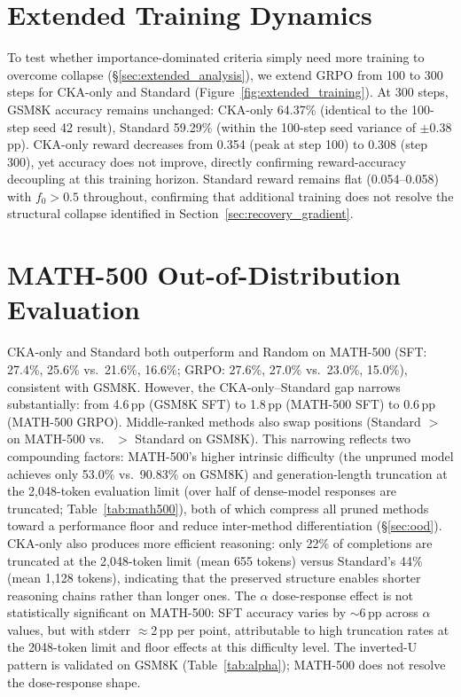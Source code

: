 \section{Extended Training Dynamics}
\label{sec:appendix_extended}

To test whether importance-dominated criteria simply need more training to overcome collapse (\S\ref{sec:extended_analysis}), we extend GRPO from 100 to 300 steps for CKA-only and Standard (Figure~\ref{fig:extended_training}).
At 300 steps, GSM8K accuracy remains unchanged: CKA-only 64.37\% (identical to the 100-step seed 42 result), Standard 59.29\% (within the 100-step seed variance of $\pm$0.38\,pp).
CKA-only reward decreases from 0.354 (peak at step 100) to 0.308 (step 300), yet accuracy does not improve, directly confirming reward-accuracy decoupling at this training horizon.
Standard reward remains flat (0.054--0.058) with $f_0 > 0.5$ throughout, confirming that additional training does not resolve the structural collapse identified in Section~\ref{sec:recovery_gradient}.

\section{MATH-500 Out-of-Distribution Evaluation}
\label{sec:appendix_math500}



CKA-only and Standard both outperform \rasp{} and Random on MATH-500 (SFT: 27.4\%, 25.6\% vs.\ 21.6\%, 16.6\%; GRPO: 27.6\%, 27.0\% vs.\ 23.0\%, 15.0\%), consistent with GSM8K.
However, the CKA-only--Standard gap narrows substantially: from 4.6\,pp (GSM8K SFT) to 1.8\,pp (MATH-500 SFT) to 0.6\,pp (MATH-500 GRPO).
Middle-ranked methods also swap positions (Standard $>$ \rasp{} on MATH-500 vs.\ \rasp{} $>$ Standard on GSM8K).
This narrowing reflects two compounding factors: MATH-500's higher intrinsic difficulty (the unpruned model achieves only 53.0\% vs.\ 90.83\% on GSM8K) and generation-length truncation at the 2{,}048-token evaluation limit (over half of dense-model responses are truncated; Table~\ref{tab:math500}), both of which compress all pruned methods toward a performance floor and reduce inter-method differentiation (\S\ref{sec:ood}).
CKA-only also produces more efficient reasoning: only 22\% of completions are truncated at the 2{,}048-token limit (mean 655 tokens) versus Standard's 44\% (mean 1{,}128 tokens), indicating that the preserved structure enables shorter reasoning chains rather than longer ones.
The $\alpha$ dose-response effect is not statistically significant on MATH-500: SFT accuracy varies by ${\sim}$6\,pp across $\alpha$ values, but with stderr ${\approx}$2\,pp per point, attributable to high truncation rates at the 2048-token limit and floor effects at this difficulty level.
The inverted-U pattern is validated on GSM8K (Table~\ref{tab:alpha}); MATH-500 does not resolve the dose-response shape.

